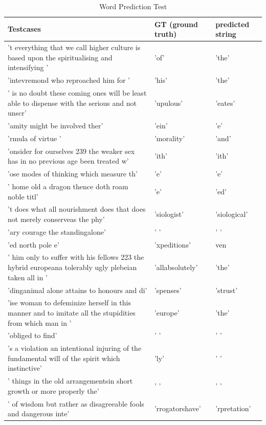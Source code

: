 \documentclass[11pt,a4paper,bibliography=totocnumbered,listof=totocnumbered]{scrartcl}
\begin{document}
\begin{table}[H]
\tiny
\centering
\caption{Word Prediction Test}
\begin{tabularx}{\textwidth}{X|X|X}

Testcases & GT (ground truth) & predicted string\\
\toprule
't everything that we call higher culture is based upon the spiritualising and intensifying ' & 'of' & 'the' \\ 
\hline 
'intevremond who reproached him for ' & 'his' & 'the' \\ 
\hline 
' is no doubt these coming ones will be least able to dispense with the serious and not unscr' & 'upulous' & 'eates' \\ 
\hline 
'amity might be involved ther' & 'ein' & 'e' \\ 
\hline 
'rmula of virtue ' & 'morality' & 'and' \\ 
\hline 
'onsider for ourselves  239 the weaker sex has in no previous age been treated w' & 'ith' & 'ith' \\ 
\hline 
'ose modes of thinking which measure th' & 'e' & 'e' \\ 
\hline 
' home old a dragon thence doth roam  noble titl' & 'e' & 'ed' \\ 
\hline 
't does what all nourishment does that does not merely conserveas the phy' & 'siologist' & 'siological' \\ 
\hline 
'ary courage the standingalone' & ' ' & ' ' \\ 
\hline 
'ed north pole e' & 'xpeditions' & ven \\ 
\hline 
' him only to suffer with his fellows  223 the hybrid europeana tolerably ugly plebeian taken all in ' & 'allabsolutely' & 'the' \\ 
\hline 
'dinganimal alone attains to honours and di' & 'spenses' & 'strust' \\ 
\hline 
'ise woman to defeminize herself in this manner and to imitate all the stupidities from which man in ' & 'europe' & 'the' \\ 
\hline 
'obliged to find' & ' ' & ' ' \\ 
\hline 
's a violation an intentional injuring of the fundamental will of the spirit which instinctive' & 'ly' & ' ' \\ 
\hline 
' things in the old arrangementsin short growth or more properly the' & ' ' & ' ' \\ 
\hline 
' of wisdom but rather as disagreeable fools and dangerous inte' & 'rrogatorshave' & 'rpretation' \\ 

\end{tabularx}
\end{table}
\end{document}
